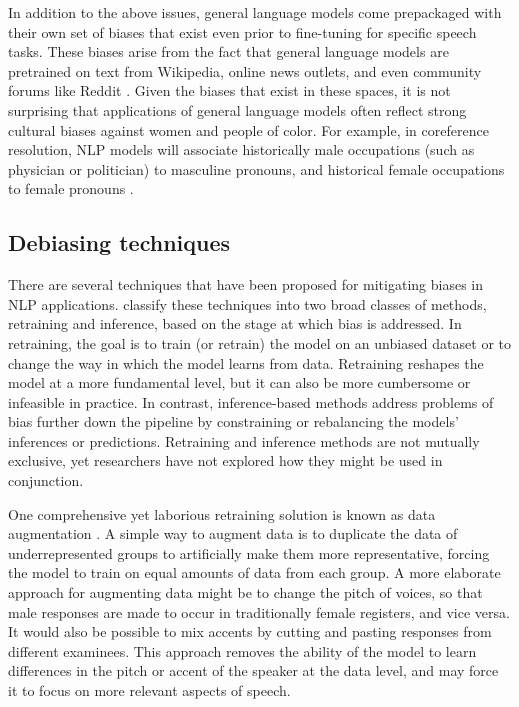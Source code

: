\documentclass [PhD] {uclathes}
\begin{document}
In addition to the above issues, general language models come prepackaged with their own set of biases that exist even prior to fine-tuning for specific speech tasks. These biases arise from the fact that general language models are pretrained on text from Wikipedia, online news outlets, and even community forums like Reddit \citep{liu2019roberta}. Given the biases that exist in these spaces, it is not surprising that applications of general language models often reflect strong cultural biases against women and people of color. For example, in coreference resolution, NLP models will associate historically male occupations (such as physician or politician) to masculine pronouns, and historical female occupations to female pronouns \citep{zhao2018gender}.

\subsection{Debiasing techniques}

There are several techniques that have been proposed for mitigating biases in NLP applications. \citet{sun2019mitigating} classify these techniques into two broad classes of methods, retraining and inference, based on the stage at which bias is addressed. In retraining, the goal is to train (or retrain) the model on an unbiased dataset or to change the way in which the model learns from data. Retraining reshapes the model at a more fundamental level, but it can also be more cumbersome or infeasible in practice. In contrast, inference-based methods address problems of bias further down the pipeline by constraining or rebalancing the models’ inferences or predictions. Retraining and inference methods are not mutually exclusive, yet researchers have not explored how they might be used in conjunction.

One comprehensive yet laborious retraining solution is known as data augmentation \citep[e.g.][]{zhao2018gender}. A simple way to augment data is to duplicate the data of underrepresented groups to artificially make them more representative, forcing the model to train on equal amounts of data from each group. A more elaborate approach for augmenting data might be to change the pitch of voices, so that male responses are made to occur in traditionally female registers, and vice versa. It would also be possible to mix accents by cutting and pasting responses from different examinees. This approach removes the ability of the model to learn differences in the pitch or accent of the speaker at the data level, and may force it to focus on more relevant aspects of speech.
\end{document}
